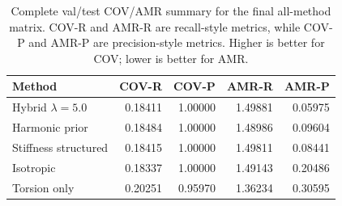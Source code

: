 \begin{table}[t]
\centering
\small
\caption{Complete val/test COV/AMR summary for the final all-method matrix. COV-R and AMR-R are recall-style metrics, while COV-P and AMR-P are precision-style metrics. Higher is better for COV; lower is better for AMR.}
\label{tab:cov-amr-summary}
\begin{tabular}{lrrrr}
\toprule
Method & COV-R & COV-P & AMR-R & AMR-P \\
\midrule
Hybrid $\lambda=5.0$ & 0.18411 & 1.00000 & 1.49881 & 0.05975 \\
Harmonic prior & 0.18484 & 1.00000 & 1.48986 & 0.09604 \\
Stiffness structured & 0.18415 & 1.00000 & 1.49811 & 0.08441 \\
Isotropic & 0.18337 & 1.00000 & 1.49143 & 0.20486 \\
Torsion only & 0.20251 & 0.95970 & 1.36234 & 0.30595 \\
\bottomrule
\end{tabular}
\end{table}
